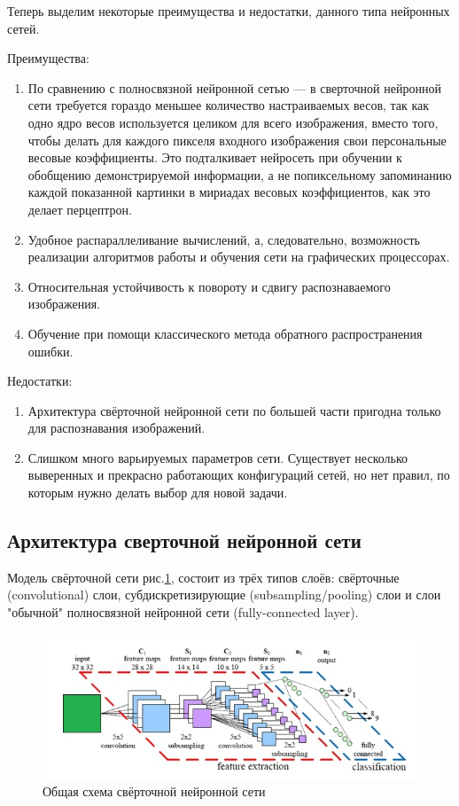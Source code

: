 \documentclass[14pt]{article}
\numberwithin{figure}{section}
\numberwithin{equation}{section}
\begin{document}
Теперь выделим некоторые преимущества и недостатки, данного типа нейронных сетей.

Преимущества:
\begin{enumerate}
	\item
	По сравнению с полносвязной нейронной сетью — в сверточной нейронной сети требуется гораздо меньшее количество настраиваемых весов, так как одно ядро весов используется целиком для всего изображения, вместо того, чтобы делать для каждого пикселя входного изображения свои персональные весовые коэффициенты. Это подталкивает нейросеть при обучении к обобщению демонстрируемой информации, а не попиксельному запоминанию каждой показанной картинки в мириадах весовых коэффициентов, как это делает перцептрон.
	\item
	Удобное распараллеливание вычислений, а, следовательно, возможность реализации алгоритмов работы и обучения сети на графических процессорах.
	\item
	Относительная устойчивость к повороту и сдвигу распознаваемого изображения.
	\item
	Обучение при помощи классического метода обратного распространения ошибки.
\end{enumerate}

Недостатки:
\begin{enumerate}
	\item
	Архитектура свёрточной нейронной сети по большей части пригодна только для распознавания изображений.
	\item
	Слишком много варьируемых параметров сети. Существует несколько выверенных и прекрасно работающих конфигураций сетей, но нет правил, по которым нужно делать выбор для новой задачи.
\end{enumerate}

\subsection{Архитектура сверточной нейронной сети}

Модель свёрточной сети рис.\ref{ris:6}, состоит из трёх типов слоёв: свёрточные (convolutional) слои, субдискретизирующие (subsampling/pooling) слои и слои "обычной" полносвязной нейронной сети (fully-connected layer).

\begin{figure}[h]
	\begin{center}
		\includegraphics[scale=0.99] {6.JPG}
		\caption{Общая схема свёрточной нейронной сети}
		\label{ris:6}
	\end{center}
\end{figure}
\end{document}
